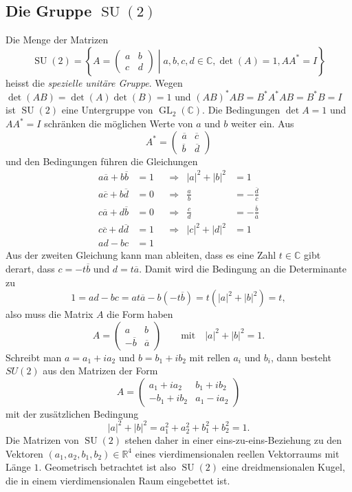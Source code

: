 \subsection{Die Gruppe $\operatorname{SU}(2)$
\label{buch:gruppen:su2}}
Die Menge der Matrizen
\[
\operatorname{SU}(2)
=
\left\{
\left.
A=\begin{pmatrix} a&b\\c&d\end{pmatrix}
\;\right|\;
a,b,c,d\in\mathbb{C},\det(A)=1, AA^*=I
\right\}
\]
heisst die {\em spezielle unitäre Gruppe}.
Wegen $\det(AB)=\det(A)\det(B)=1$ und $(AB)^*AB=B^*A^*AB=B^*B=I$ ist 
$\operatorname{SU}(2)$ eine Untergruppe von $\operatorname{GL}_2(\mathbb{C})$.
Die Bedingungen $\det A=1$ und $AA^*=I$ schränken die möglichen Werte
von $a$ und $b$ weiter ein.
Aus 
\[
A^*
=
\begin{pmatrix}
\overline{a}&\overline{c}\\
\overline{b}&\overline{d}
\end{pmatrix}
\]
und den Bedingungen führen die Gleichungen
\[
\begin{aligned}
a\overline{a}+b\overline{b}&=1
&&\Rightarrow&|a|^2+|b|^2&=1
\\
a\overline{c}+b\overline{d}&=0
&&\Rightarrow&
\frac{a}{b}&=-\frac{\overline{d}}{\overline{c}}
\\
c\overline{a}+d\overline{b}&=0
&&\Rightarrow&
\frac{c}{d}&=-\frac{\overline{b}}{\overline{a}}
\\
c\overline{c}+d\overline{d}&=1&&\Rightarrow&|c|^2+|d|^2&=1
\\
ad-bc&=1
\end{aligned}
\]
Aus der zweiten Gleichung kann man ableiten, dass es eine Zahl $t\in\mathbb{C}$
gibt derart, dass $c=-t\overline{b}$ und $d=t\overline{a}$.
Damit wird die Bedingung an die Determinante zu
\[
1
=
ad-bc = at\overline{a} - b(-t\overline{b})
=
t(|a|^2+|b|^2)
=
t,
\]
also muss die Matrix $A$ die Form haben
\[
A
=
\begin{pmatrix}
a&b\\
-\overline{b}&\overline{a}
\end{pmatrix}
\qquad\text{mit}\quad |a|^2+|b|^2=1.
\]
Schreibt man $a=a_1+ia_2$ und $b=b_1+ib_2$ mit rellen $a_i$ und $b_i$,
dann besteht $SU(2)$  aus den Matrizen der Form
\[
A=
\begin{pmatrix}
 a_1+ia_2&b_1+ib_2\\
-b_1+ib_2&a_1-ia_2
\end{pmatrix}
\]
mit der zusätzlichen Bedingung
\[
|a|^2+|b|^2
=
a_1^2 + a_2^2 + b_1^2 + b_2^2 = 1.
\]
Die Matrizen von $\operatorname{SU}(2)$ stehen daher in einer
eins-zu-eins-Beziehung zu den Vektoren $(a_1,a_2,b_1,b_2)\in\mathbb{R}^4$
eines vierdimensionalen reellen Vektorraums mit Länge $1$.
Geometrisch betrachtet ist also $\operatorname{SU}(2)$ eine dreidmensionalen
Kugel, die in einem vierdimensionalen Raum eingebettet ist.



